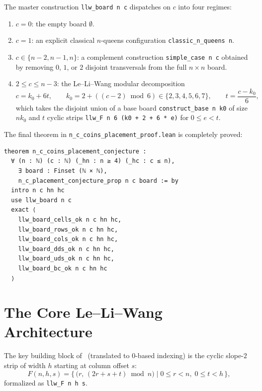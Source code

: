 \documentclass[11pt,a4paper]{article}
\theoremstyle{remark}
\begin{document}
The master construction \texttt{llw\_board n c} dispatches on $c$ into four regimes:
\begin{enumerate}[nosep]
  \item $c = 0$: the empty board $\emptyset$.
  \item $c = 1$: an explicit classical $n$-queens configuration \texttt{classic\_n\_queens n}.
  \item $c \in \{n - 2, n - 1, n\}$: a complement construction \texttt{simple\_case n c} obtained by removing $0$, $1$, or $2$ disjoint transversals from the full $n \times n$ board.
  \item $2 \le c \le n - 3$: the Le--Li--Wang modular decomposition
  \[
    c = k_0 + 6t, \qquad k_0 = 2 + ((c - 2) \bmod 6) \in \{2, 3, 4, 5, 6, 7\}, \qquad t = \frac{c - k_0}{6},
  \]
  which takes the disjoint union of a base board \texttt{construct\_base n k0} of size $nk_0$ and $t$ cyclic strips \texttt{llw\_F n 6 (k0 + 2 + 6 * e)} for $0 \le e < t$.
\end{enumerate}

The final theorem in \texttt{n\_c\_coins\_placement\_proof.lean} is completely proved:
\begin{lstlisting}[language=Lean4]
theorem n_c_coins_placement_conjecture :
  ∀ (n : ℕ) (c : ℕ) (_hn : n ≥ 4) (_hc : c ≤ n),
    ∃ board : Finset (ℕ × ℕ),
    n_c_placement_conjecture_prop n c board := by
  intro n c hn hc
  use llw_board n c
  exact ⟨
    llw_board_cells_ok n c hn hc,
    llw_board_rows_ok n c hn hc,
    llw_board_cols_ok n c hn hc,
    llw_board_dds_ok n c hn hc,
    llw_board_uds_ok n c hn hc,
    llw_board_bc_ok n c hn hc
  ⟩
\end{lstlisting}

\section{The Core Le--Li--Wang Architecture}

The key building block of~\cite{LLW1990} (translated to $0$-based indexing) is the cyclic slope-$2$ strip of width $h$ starting at column offset $s$:
\[
  F(n, h, s) = \bigl\{\, \bigl(r,\, (2r + s + t) \bmod n\bigr) \;\big|\; 0 \le r < n,\; 0 \le t < h \,\bigr\},
\]
formalized as \texttt{llw\_F n h s}.
\end{document}
